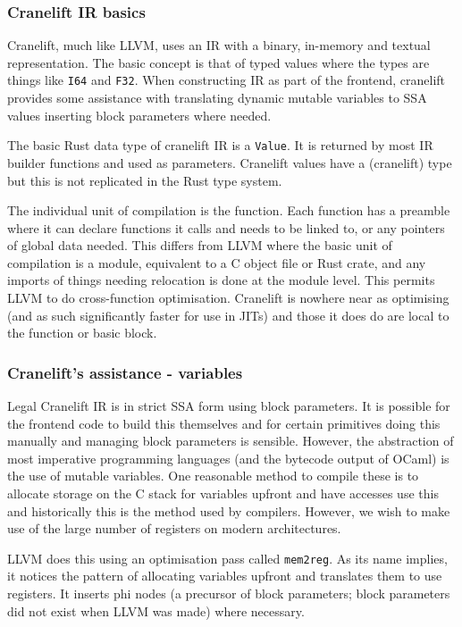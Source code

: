 

\subsubsection{Cranelift IR basics}

Cranelift, much like LLVM, uses an IR with a binary, in-memory and textual representation. The
basic concept is that of typed values where the types are things like \texttt{I64} and
\texttt{F32}. When constructing IR as part of the frontend, cranelift provides some assistance with
translating dynamic mutable variables to SSA values inserting block parameters where needed.

The basic Rust data type of cranelift IR is a \texttt{Value}. It is returned by most IR builder
functions and used as parameters. Cranelift values have a (cranelift) type but this is not
replicated in the Rust type system.

The individual unit of compilation is the function. Each function has a preamble where it can
declare functions it calls and needs to be linked to, or any pointers of global data needed. This
differs from LLVM where the basic unit of compilation is a module, equivalent to a C object file or
Rust crate, and any imports of things needing relocation is done at the module level. This permits
LLVM to do cross-function optimisation. Cranelift is nowhere near as optimising (and as such
significantly faster for use in JITs) and those it does do are local to the function or basic
block.

\subsubsection{Cranelift's assistance - variables}

Legal Cranelift IR is in strict SSA form using block parameters. It is possible for the frontend
code to build this themselves and for certain primitives doing this manually and managing block
parameters is sensible. However, the abstraction of most imperative programming languages (and the
bytecode output of OCaml) is the use of mutable variables. One reasonable method to compile these
is to allocate storage on the C stack for variables upfront and have accesses use this and
historically this is the method used by compilers. However, we wish to make use of the large number
of registers on modern architectures.

LLVM does this using an optimisation pass called \texttt{mem2reg}. As its name implies, it notices
the pattern of allocating variables upfront and translates them to use registers. It inserts phi
nodes (a precursor of block parameters; block parameters did not exist when LLVM was made) where
necessary.

